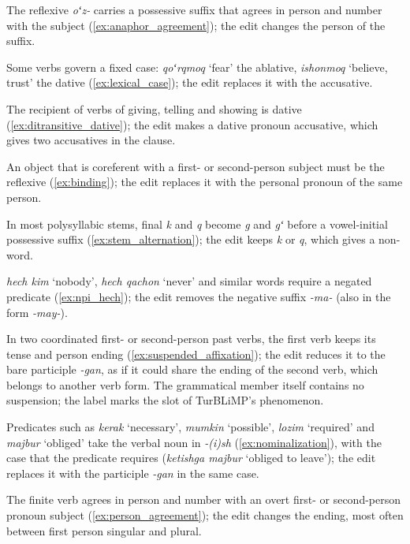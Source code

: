 \documentclass[11pt]{article}
\newcommand{\uz}[1]{\textit{#1}}
\begin{document}
\begin{description}\itemsep0pt
\item[Anaphor agreement.] The reflexive \uz{oʻz-} carries a possessive suffix that agrees in person and number with the subject (\ref{ex:anaphor_agreement}); the edit changes the person of the suffix.
\item[Lexical case.] Some verbs govern a fixed case: \uz{qoʻrqmoq} `fear' the ablative, \uz{ishonmoq} `believe, trust' the dative (\ref{ex:lexical_case}); the edit replaces it with the accusative.
\item[Ditransitive dative.] The recipient of verbs of giving, telling and showing is dative (\ref{ex:ditransitive_dative}); the edit makes a dative pronoun accusative, which gives two accusatives in the clause.
\item[Binding.] An object that is coreferent with a first- or second-person subject must be the reflexive (\ref{ex:binding}); the edit replaces it with the personal pronoun of the same person.
\item[Stem alternation.] In most polysyllabic stems, final \uz{k} and \uz{q} become \uz{g} and \uz{gʻ} before a vowel-initial possessive suffix (\ref{ex:stem_alternation}); the edit keeps \uz{k} or \uz{q}, which gives a non-word.
\item[NPI \uz{hech}.] \uz{hech kim} `nobody', \uz{hech qachon} `never' and similar words require a negated predicate (\ref{ex:npi_hech}); the edit removes the negative suffix \uz{-ma-} (also in the form \uz{-may-}).
\item[Suspended affixation.] In two coordinated first- or second-person past verbs, the first verb keeps its tense and person ending (\ref{ex:suspended_affixation}); the edit reduces it to the bare participle \uz{-gan}, as if it could share the ending of the second verb, which belongs to another verb form. The grammatical member itself contains no suspension; the label marks the slot of TurBLiMP's phenomenon.
\item[Nominalisation.] Predicates such as \uz{kerak} `necessary', \uz{mumkin} `possible', \uz{lozim} `required' and \uz{majbur} `obliged' take the verbal noun in \uz{-(i)sh} (\ref{ex:nominalization}), with the case that the predicate requires (\uz{ketishga majbur} `obliged to leave'); the edit replaces it with the participle \uz{-gan} in the same case.
\item[Subject agreement.] The finite verb agrees in person and number with an overt first- or second-person pronoun subject (\ref{ex:person_agreement}); the edit changes the ending, most often between first person singular and plural.

\end{description}
\end{document}
